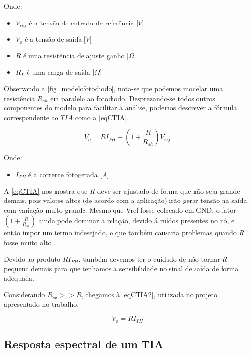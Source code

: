 Onde:

\begin{itemize}
    \item $V_{ref}$ \'e a tensão de entrada de referência [$V$]
    \item $V_o$ \'e a tensão de sa\'ida [$V$]
    \item $R$ \'e uma resist\^encia de ajuste ganho [$\Omega$]
    \item $R_L$ \'e uma carga de sa\'ida [$\Omega$]
\end{itemize}

Observando a \autoref{fig_modelofotodiodo}, nota-se que podemos modelar uma resist\^encia $R_{sh}$ em paralelo ao fotodiodo. Desprezando-se todos outros componentes do modelo para facilitar a an\'alise, podemos descrever a f\'ormula correspondente ao $TIA$ como a \autoref{eqCTIA}.

\begin{equation}
    \label{eqCTIA}
    V_o = RI_{PH} + (1+\frac{R}{R_{sh}})V_{ref}
\end{equation}

Onde:
\begin{itemize}
    \item $I_{PH}$ \'e a corrente fotogerada [$A$]
\end{itemize}

A \autoref{eqCTIA} nos mostra que \textit{R} deve ser ajustado de forma que não seja grande demais, pois valores altos (de acordo com a aplicação) irão gerar tensão na sa\'ida com variação muito grande. Mesmo que Vref fosse colocado em GND, o fator $(1+\frac{R}{R_{sh}})$ ainda pode dominar a relação, devido \'a ruídos presentes no nó, e então impor um termo indesejado, o que também causaria problemas quando \textit{R} fosse muito alto \cite{hamamatsu}.

Devido ao produto $RI_{PH}$, também devemos ter o cuidado de não tornar \textit{R} pequeno demais para que tenhamos a sensibilidade no sinal de saída de forma adequada.

Considerando $R_{sh} >> R$, chegamos à \autoref{eqCTIA2}, utilizada no projeto apresentado no trabalho.

\begin{equation}
    \label{eqCTIA2}
    V_o = RI_{PH}
\end{equation}

\subsection{Resposta espectral de um TIA}

